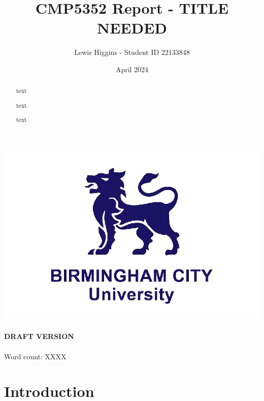 \documentclass[12pt]{report}\usepackage[]{graphicx}\usepackage[]{xcolor}
\title{CMP5352 Report - TITLE NEEDED}
\author{Lewis Higgins - Student ID 22133848}
\date{April 2024}
\begin{document}
 \pagecolor{yellow} %



    \makeatletter
    \begin{titlepage}
        \begin{center}
            \includegraphics[width=0.7\linewidth]{bcu logo}\\[4ex]
            {\large \bfseries  \@title }\\[2ex]
            {\large \bfseries  DRAFT VERSION }\\[2ex]
            {\@author}\\[30ex]
            {Word count: XXXX}\\[20ex]
        \end{center}
    \end{titlepage}
    \makeatother
    \thispagestyle{empty}
    \newpage

  \pagecolor{white} %

    \begin{abstract}
        text

        text

        text

    \end{abstract} 
    
    \setcounter{page}{0}

    \tableofcontents
    \thispagestyle{empty}

    \chapter*{Introduction}\label{ch:introduction}
\end{document}
